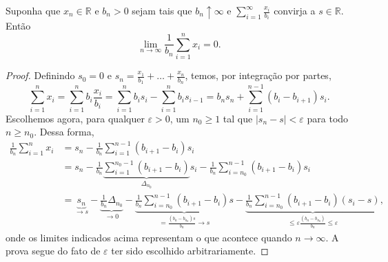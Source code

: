 \begin{topics}
\begin{lemma}
  Suponha que $x_n \in \mathbb{R}$ e $b_n > 0$ sejam tais que $b_n \uparrow \infty$ e $\sum_{i=1}^\infty \frac{x_i}{b_i}$ convirja a $s \in \mathbb{R}$.
  Então
  \begin{equation}
    \lim_{n \to \infty} \frac{1}{b_n} \sum_{i=1}^n x_i = 0.
  \end{equation}
\end{lemma}

\begin{proof}
  Definindo $s_0 = 0$ e $s_n = \tfrac{x_1}{b_1} + \dots + \tfrac{x_n}{b_n}$, temos, por integração por partes,
  \begin{equation}
    \sum_{i=1}^n x_i = \sum_{i=1}^n b_i \frac{x_i}{b_i} = \sum_{i=1}^n b_i s_{i} - \sum_{i=1}^n b_i s_{i-1} = b_n s_n + \sum_{i=1}^{n-1} (b_{i} - b_{i+1}) s_{i}.
  \end{equation}
  Escolhemos agora, para qualquer $\varepsilon > 0$, um $n_0 \geq 1$ tal que $|s_n - s| < \varepsilon$ para todo $n \geq n_0$.
  Dessa forma,
  \begin{equation*}
    \begin{split}
      \frac{1}{b_n} \sum_{i=1}^n x_i & = s_n - \frac{1}{b_n}\sum_{i=1}^{n-1} (b_{i+1} - b_{i}) s_{i}\\
      & = s_n - \frac{1}{b_n}\underbrace{\sum_{i=1}^{n_0-1} (b_{i+1} - b_{i})}_{\Delta_{n_0}} s_{i} - \frac{1}{b_n}\sum_{i=n_0}^{n-1} (b_{i+1} - b_{i}) s_{i}\\
      & = \underbrace{s_n}_{\to s} - \underbrace{\frac{1}{b_n}\Delta_{n_0}}_{\to 0} - \underbrace{\frac{1}{b_n}\sum_{i=n_0}^{n-1} (b_{i+1} - b_i) s}_{= \tfrac{(b_n - b_{n_0})s}{b_n} \to s} - \underbrace{\frac{1}{b_n}\sum_{i=n_0}^{n-1} (b_{i+1} - b_{i}) (s_{i} - s)}_{\leq \varepsilon\tfrac{(b_n - b_{n_0})}{b_n} \leq \varepsilon},
    \end{split}
  \end{equation*}
  onde os limites indicados acima representam o que acontece quando $n \to \infty$.
  A prova segue do fato de $\varepsilon$ ter sido escolhido arbitrariamente.
\end{proof}


\end{topics}
